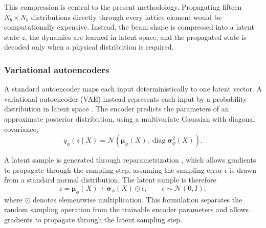 This compression is central to the present methodology. Propagating fifteen $N_b\times N_b$ distributions directly through every lattice element would be computationally expensive. Instead, the beam shape is compressed into a latent state $z$, the dynamics are learned in latent space, and the propagated state is decoded only when a physical distribution is required.

\subsubsection{Variational autoencoders}
\label{subsubsec:vae_foundations}

A standard autoencoder maps each input deterministically to one latent vector. A variational autoencoder (VAE) instead represents each input by a probability distribution in latent space \cite{kingma_autoencoding_2014}. The encoder predicts the parameters of an approximate posterior distribution, using a multivariate Gaussian with diagonal covariance,
\begin{equation}
    q_{\phi}(z\mid X)
    =
    \mathcal{N}
    \left(
    \bm{\mu}_{\phi}(X),
    \operatorname{diag}
    \bm{\sigma}_{\phi}^{2}(X)
    \right).
    \label{eq:vae_posterior_intro}
\end{equation}

A latent sample is generated through reparametrization \cite{kingma_autoencoding_2014}, which allows gradients to propagate through the sampling step, assuming the sampling error $\epsilon$ is drawn from a standard normal distribution. The latent sample is therefore
\begin{equation}
    z
    =
    \bm{\mu}_{\phi}(X)
    +
    \bm{\sigma}_{\phi}(X)
    \odot
    \epsilon,
    \qquad
    \epsilon
    \sim
    \mathcal{N}(0,I),
    \label{eq:vae_reparameterization_intro}
\end{equation}
where $\odot$ denotes elementwise multiplication. This formulation separates the random sampling operation from the trainable encoder parameters and allows gradients to propagate through the latent sampling step.

